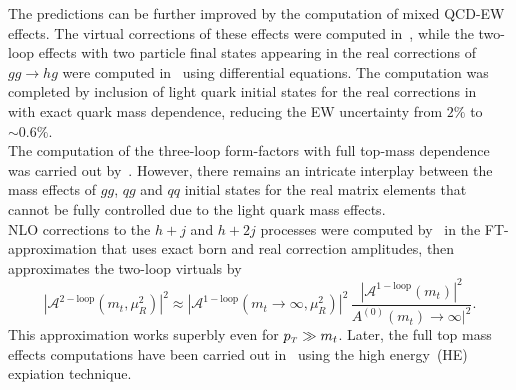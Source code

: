 The predictions can be further improved by the computation of mixed QCD-EW effects. The virtual corrections of these effects were computed in~\cite{Bonetti:2017ovy}, while the two-loop effects with two particle final states appearing in the real corrections of $ gg \to hg$  were computed in~\cite{Bonetti:2020hqh} using differential equations. The computation was completed by inclusion of light quark initial states for the real corrections in~\cite{Becchetti:2020wof} with exact quark mass dependence, reducing the EW uncertainty from $2\%$ to $ \sim 0.6\%$.  \\ The computation of the three-loop form-factors with full top-mass dependence was carried out by~\cite{Czakon:2020vql,Czakon:2021yub}. However, there remains an intricate interplay between the mass effects of $gg$, $qg$ and $qq$ initial states for the real matrix elements that cannot be fully controlled due to the light quark mass effects. \\ NLO corrections to the $h +j$ and $ h+2j$ processes were computed by~\cite{Maltoni:2014eza} in the FT-approximation that uses exact born and real correction amplitudes, then approximates the two-loop virtuals by
\begin{equation}
	|	\mathcal A^{\mathrm{2-loop}}(m_t,\mu_R^2) |^2 \approx  |	\mathcal A^{\mathrm{1-loop}}(m_t\to \infty,\mu_R^2) |^2\, \frac{|	\mathcal A^{\mathrm{1-loop}}(m_t) |^2}{A^{\mathrm{(0)}}(m_t)\to \infty |^2}. 
\end{equation}
This approximation works superbly even for $ p_{\scriptscriptstyle T} \gg m_t$. Later, the full top mass effects computations have been carried out in~\cite{Kudashkin:2017skd, Lindert:2018iug, PhysRevLett.120.162001} using the high energy~(HE) expiation technique. 
